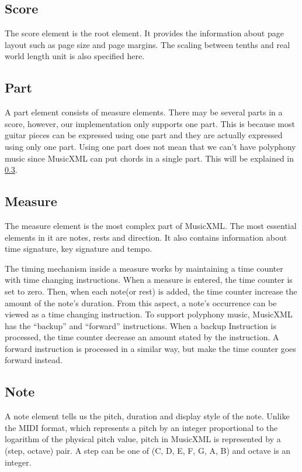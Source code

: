 \subsection{Score}
The score element is the root element. It provides the information about page layout such as page size and page margins. The scaling between tenths and real world length unit is also specified here.

\subsection{Part}
A part element consists of measure elements. There may be several parts in a score, however, our implementation only supports one part. This is because most guitar pieces can be expressed using one part and they are actually expressed using only one part. Using one part does not mean that we can't have polyphony music since MusicXML can put chords in a single part. This will be explained in \ref{section:measure}.

\subsection{Measure}
\label{section:measure}
The measure element is the most complex part of MusicXML. The most essential elements in it are notes, rests and direction. It also contains information about time signature, key signature and tempo.

The timing mechanism inside a measure works by maintaining a time counter with time changing instructions. When a measure is entered, the time counter is set to zero. Then, when each note(or rest) is added, the time counter increase the amount of the note's duration. From this aspect, a note's occurrence can be viewed as a time changing instruction. To support polyphony music, MusicXML has the ``backup'' and ``forward'' instructions. When a backup Instruction is processed, the time counter decrease an amount stated by the instruction. A forward instruction is processed in a similar way, but make the time counter goes forward instead.

\subsection{Note}
A note element tells us the pitch, duration and display style of the note. Unlike the MIDI format, which represents a pitch by an integer proportional to the logarithm of the physical pitch value, pitch in MusicXML is represented by a (step, octave) pair. A step can be one of (C, D, E, F, G, A, B) and octave is an integer.

